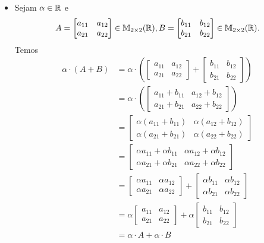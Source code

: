\documentclass[12pt]{exam}
\begin{document}
\begin{itemize}
        \item Sejam $\alpha \in \mathbb{R}$ e
        \[
        A = \begin{bmatrix} a_{11} & a_{12}\\a_{21} & a_{22}\end{bmatrix} \in \mathbb{M}_{2 \times 2}(\mathbb{R}),
        B = \begin{bmatrix} b_{11} & b_{12}\\b_{21} & b_{22}\end{bmatrix} \in \mathbb{M}_{2 \times 2}(\mathbb{R}).
        \]
        Temos
        \begin{align*}
            \alpha\cdot(A + B) & = \alpha\cdot\left(
            \begin{bmatrix} a_{11} & a_{12}\\a_{21} & a_{22}\end{bmatrix} +
            \begin{bmatrix} b_{11} & b_{12}\\b_{21} & b_{22}\end{bmatrix}\right)
            \\ &= \alpha\cdot\left(\begin{bmatrix} a_{11} + b_{11} & a_{12} + b_{12}\\a_{21} + b_{21} & a_{22} + b_{22}\end{bmatrix}\right)
            \\ &= \begin{bmatrix} \alpha(a_{11} + b_{11}) & \alpha(a_{12} + b_{12})\\\alpha(a_{21} + b_{21}) & \alpha(a_{22} + b_{22})\end{bmatrix}
            \\ &= \begin{bmatrix} \alpha a_{11} + \alpha b_{11} & \alpha a_{12} + \alpha b_{12}\\\alpha a_{21} + \alpha b_{21} & \alpha a_{22} + \alpha b_{22}\end{bmatrix}
            \\ &= \begin{bmatrix} \alpha a_{11} & \alpha a_{12}\\ \alpha a_{21} & \alpha a_{22}\end{bmatrix}
            + \begin{bmatrix} \alpha b_{11} & \alpha b_{12}\\ \alpha b_{21} & \alpha b_{22}\end{bmatrix}
            \\ &= \alpha\begin{bmatrix} a_{11} & a_{12}\\a_{21} & a_{22}\end{bmatrix} +
            \alpha\begin{bmatrix} b_{11} & b_{12}\\b_{21} & b_{22}\end{bmatrix}
            \\ &= \alpha\cdot A + \alpha\cdot B
        \end{align*}


\end{itemize}
\end{document}
